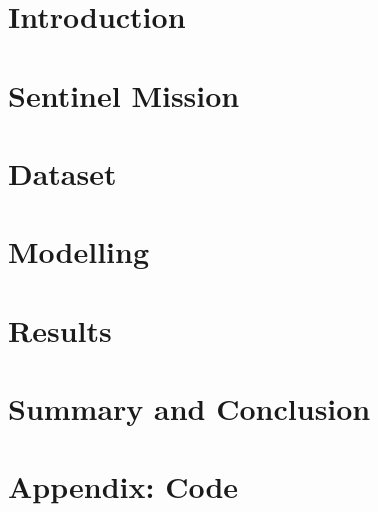 \documentclass[12pt, a4paper]{report}
\begin{document}





\tableofcontents

\chapter{Introduction}


\chapter{Sentinel Mission}


\chapter{Dataset} \label{chap:Dataset}


\chapter{Modelling}


\chapter{Results}


\chapter{Summary and Conclusion}


\appendix
\chapter{Appendix: Code}




\end{document}
